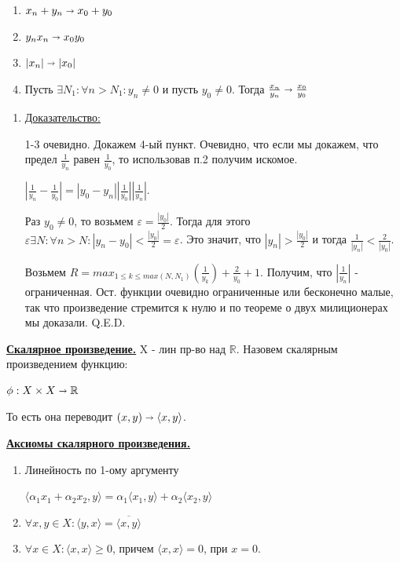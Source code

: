 \documentclass{article}
\newcommand{\thmm}[1]{\underline{\textbf{#1}}}
\begin{document}
    \begin{enumerate}
        \item $x_n + y_n \shortrightarrow x_0 +y_0$
        \item $y_n x_n \shortrightarrow x_0 y_0$
        \item $|x_n| \shortrightarrow |x_0|$
        \item Пусть $\exists N_1: \forall n > N_1: y_n \neq 0$ и пусть $y_0 \neq 0$. Тогда $\frac{x_n}{y_n} \shortrightarrow \frac{x_0}{y_0}$
    \end{enumerate}
    \begin{enumerate}
    \item[] \uline{Доказательство:}

    1-3 очевидно. Докажем 4-ый пункт. Очевидно, что если мы докажем, что предел $\frac{1}{y_n} $ равен $ \frac{1}{y_0}$, то использовав п.2 получим искомое.

    $\displaystyle |\frac{1}{y_n}-\frac{1}{y_0}|=|y_0-y_n| |\frac{1}{y_0} ||\frac{1}{y_n}|$. 


    Раз $y_0 \neq 0$, то возьмем $\varepsilon=\frac{|y_0|}{2}$. Тогда для этого $\varepsilon \exists N: \forall n> N: |y_n-y_0|<\frac{|y_0|}{2} = \varepsilon$. Это значит, что $|y_n| > \frac{|y_0|}{2}$ и тогда $\frac{1}{|y_n|}<\frac{2}{|y_0|}$.
    
    Возьмем $R = max_{1\leq k \leq max(N, N_1)}(\frac{1}{y_k}) + \frac{2}{y_0} +1$. Получим, что $|\frac{1}{y_n}|$ - ограниченная. Ост. функции очевидно ограниченные или бесконечно малые, так что произведение стремится к нулю и по теореме о двух милиционерах мы доказали. Q.E.D.    
    \end{enumerate}
    \thmm{Скалярное произведение.}
    X - лин пр-во над $\mathbb{R}$. Назовем скалярным произведением функцию:

    $\phi: X \times X \shortrightarrow \mathbb{R}$

    То есть она переводит $(x,y)\shortrightarrow \langle x,y \rangle$.

    \thmm{Аксиомы скалярного произведения.}
    \begin{enumerate}
        \item Линейность по 1-ому аргументу

        $\langle \alpha_1 x_1 + \alpha_2 x_2,y \rangle = \alpha_1 \langle x_1,y \rangle + \alpha_2 \langle x_2,y \rangle $

        \item $\forall x,y \in X: \langle y,x \rangle = \overline{\langle x,y \rangle} $

        \item $\forall x \in X: \langle x,x\rangle \geq 0$, причем $\langle x,x\rangle = 0$, при $x=0$.
    \end{enumerate}
\end{document}
